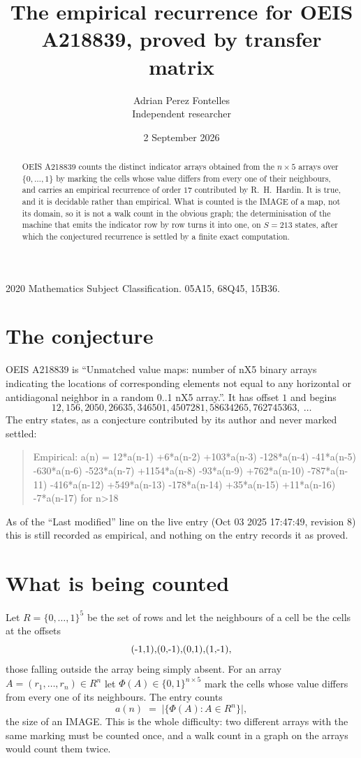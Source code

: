 \documentclass[11pt,a4paper]{article}
\title{The empirical recurrence for OEIS A218839, proved by transfer matrix}
\author{Adrian Perez Fontelles\\ \small Independent researcher}
\date{2 September 2026}
\theoremstyle{plain}
\theoremstyle{definition}
\begin{document}
\maketitle

\begin{abstract}
OEIS A218839 counts the distinct indicator arrays obtained from the $n\times5$ arrays over
$\{0,\dots,1\}$ by marking the cells whose value differs from every one of their neighbours, and carries an
empirical recurrence of order $17$ contributed by R.~H.~Hardin. It is true, and it is
decidable rather than empirical. What is counted is the IMAGE of a map, not its domain, so it
is not a walk count in the obvious graph; the determinisation of the machine that emits the
indicator row by row turns it into one, on $S=213$ states, after which the conjectured
recurrence is settled by a finite exact computation.
\end{abstract}

\noindent\small 2020 Mathematics Subject Classification. 05A15, 68Q45, 15B36.\normalsize

\section{The conjecture}

OEIS A218839 is ``Unmatched value maps: number of nX5 binary arrays indicating the locations of corresponding elements not equal to any horizontal or antidiagonal neighbor in a random 0..1 nX5 array.''. It has offset $1$ and begins
\[
12, 156, 2050, 26635, 346501, 4507281, 58634265, 762745363,\ \dots
\]
The entry states, as a conjecture contributed by its author and never marked settled:
\begin{quote}
Empirical: a(n) = 12*a(n-1) +6*a(n-2) +103*a(n-3) -128*a(n-4) -41*a(n-5) -630*a(n-6) -523*a(n-7) +1154*a(n-8) -93*a(n-9) +762*a(n-10) -787*a(n-11) -416*a(n-12) +549*a(n-13) -178*a(n-14) +35*a(n-15) +11*a(n-16) -7*a(n-17) for n>18
\end{quote}
As of the ``Last modified'' line on the live entry (Oct 03 2025 17:47:49, revision 8) this is still
recorded as empirical, and nothing on the entry records it as proved.

\section{What is being counted}

Let $R=\{0,\dots,1\}^{5}$ be the set of rows and let the neighbours of a cell be the
cells at the offsets
\[
$(-1,1)$, $(0,-1)$, $(0,1)$, $(1,-1)$,
\]
those falling outside the array being simply absent. For an array
$A=(r_1,\dots,r_n)\in R^n$ let $\Phi(A)\in\{0,1\}^{n\times5}$ mark the cells whose value
differs from every one of its neighbours. The entry counts
\[
a(n)\;=\;\bigl|\{\Phi(A):A\in R^n\}\bigr| ,
\]
the size of an IMAGE. This is the whole difficulty: two different arrays with the same marking
must be counted once, and a walk count in a graph on the arrays would count them twice.
\end{document}
